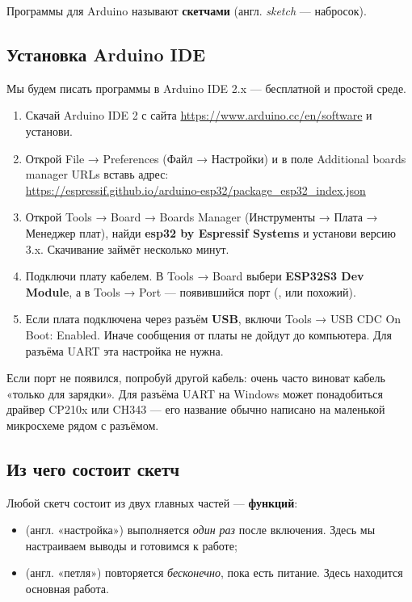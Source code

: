Программы для Arduino называют \textbf{скетчами} (англ. \emph{sketch} --- набросок).

\subsection{Установка Arduino IDE}

Мы будем писать программы в Arduino IDE 2.x --- бесплатной и простой среде.

\begin{enumerate}
  \item Скачай Arduino IDE 2 с сайта \url{https://www.arduino.cc/en/software} и установи.
  \item Открой \textsf{File → Preferences} (Файл → Настройки) и в поле
        \textsf{Additional boards manager URLs} вставь адрес:\\
    {\small\url{https://espressif.github.io/arduino-esp32/package_esp32_index.json}}
  \item Открой \textsf{Tools → Board → Boards Manager} (Инструменты → Плата → Менеджер плат),
        найди \textbf{esp32 by Espressif Systems} и установи версию 3.x. Скачивание займёт несколько минут.
  \item Подключи плату кабелем. В \textsf{Tools → Board} выбери \textbf{ESP32S3 Dev Module},
        а в \textsf{Tools → Port} --- появившийся порт (,  или похожий).
  \item Если плата подключена через разъём \textbf{USB}, включи \textsf{Tools → USB CDC On Boot: Enabled}.
        Иначе сообщения от платы не дойдут до компьютера. Для разъёма UART эта настройка не нужна.
\end{enumerate}

\begin{tip}
Если порт не появился, попробуй другой кабель: очень часто виноват кабель «только для зарядки».
Для разъёма UART на Windows может понадобиться драйвер CP210x или CH343 --- его название обычно
написано на маленькой микросхеме рядом с разъёмом.
\end{tip}

\subsection{Из чего состоит скетч}

Любой скетч состоит из двух главных частей --- \textbf{функций}:
\begin{itemize}
  \item {} (англ. «настройка») выполняется \emph{один раз} после включения. Здесь мы
        настраиваем выводы и готовимся к работе;
  \item {} (англ. «петля») повторяется \emph{бесконечно}, пока есть питание. Здесь
        находится основная работа.
\end{itemize}

